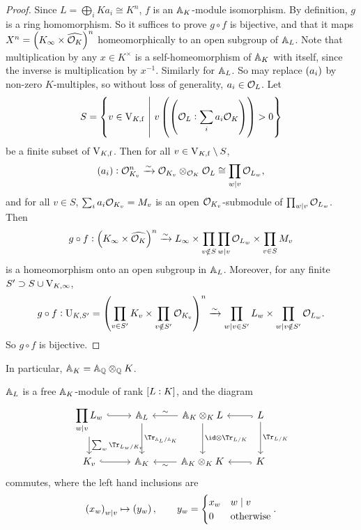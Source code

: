 \begin{proof}
Since $ L = \bigoplus_i Ka_i \cong K^n $, $ f $ is an $ \AA_K $-module isomorphism. By definition, $ g $ is a ring homomorphism. So it suffices to prove $ g \circ f $ is bijective, and that it maps $ X^n = \br{K_\infty \times \widehat{\OOO_K}}^n $ homeomorphically to an open subgroup of $ \AA_L $. Note that multiplication by any $ x \in K^\times $ is a self-homeomorphism of $ \AA_K $ with itself, since the inverse is multiplication by $ x^{-1} $. Similarly for $ \AA_L $. So may replace $ \br{a_i} $ by non-zero $ K $-multiples, so without loss of generality, $ a_i \in \OOO_L $. Let
$$ S = \cbr{v \in \V_{K, \f} \st v\br{\br{\OOO_L : \sum_i a_i\OOO_K}} > 0} $$
be a finite subset of $ \V_{K, \f} $. Then for all $ v \in \V_{K, \f} \setminus S $,
$$ \br{a_i} : \OOO_{K_v}^n \xrightarrow{\sim} \OOO_{K_v} \otimes_{\OOO_K} \OOO_L \cong \prod_{w \mid v} \OOO_{L_w}, $$
and for all $ v \in S $, $ \sum_i a_i\OOO_{K_v} = M_v $ is an open $ \OOO_{K_v} $-submodule of $ \prod_{w \mid v} \OOO_{L_w} $. Then
$$ g \circ f : \br{K_\infty \times \widehat{\OOO_K}}^n \xrightarrow{\sim} L_\infty \times \prod_{v \notin S} \prod_{w \mid v} \OOO_{L_w} \times \prod_{v \in S} M_v $$
is a homeomorphism onto an open subgroup in $ \AA_L $. Moreover, for any finite $ S' \supset S \cup \V_{K, \infty} $,
$$ g \circ f : \U_{K, S'} = \br{\prod_{v \in S'} K_v \times \prod_{v \notin S'} \OOO_{K_v}}^n \xrightarrow{\sim} \prod_{w \mid v \in S'} L_w \times \prod_{w \mid v \notin S'} \OOO_{L_w}. $$
So $ g \circ f $ is bijective.
\end{proof}

In particular, $ \AA_K = \AA_\QQ \otimes_\QQ K $.

\pagebreak

\begin{corollary}
$ \AA_L $ is a free $ \AA_K $-module of rank $ \sbr{L : K} $, and the diagram
$$
\begin{tikzcd}
\displaystyle\prod_{w \mid v} L_w \arrow[hookrightarrow]{r} \arrow{d}{\sum_w \Tr_{L_w / K_v}} & \AA_L \arrow{d}{\Tr_{\AA_L / \AA_K}} & \AA_K \otimes_K L \arrow{l}[swap]{\sim} \arrow{d}{\id \otimes \Tr_{L / K}} & L \arrow[hookrightarrow]{l} \arrow{d}{\Tr_{L / K}} \\
K_v \arrow[hookrightarrow]{r} & \AA_K & \AA_K \otimes_K K \arrow{l}{\sim} & K \arrow[hookrightarrow]{l}
\end{tikzcd}
$$
commutes, where the left hand inclusions are
$$ \br{x_w}_{w \mid v} \mapsto \br{y_w}, \qquad y_w =
\begin{cases}
x_w & w \mid v \\
0 & \text{otherwise}
\end{cases}.
$$
\end{corollary}

